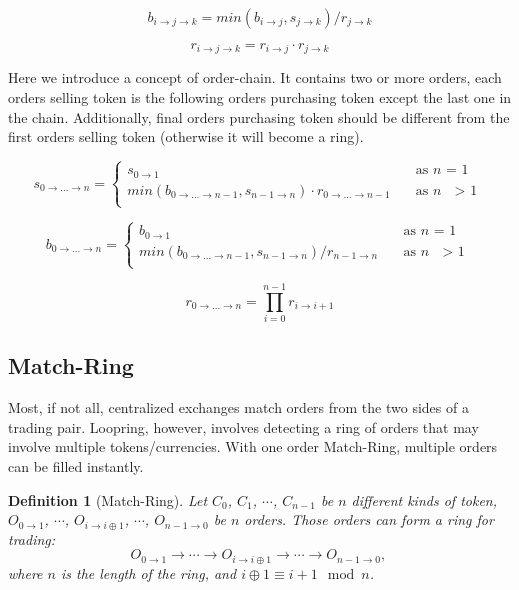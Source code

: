 \documentclass[UTF8,nofonts]{article}
\newtheorem{definition}{Definition}[section]
\begin{document}
\begin{equation}
b_{i\rightarrow j\rightarrow k}=min(b_{i\rightarrow j}, s_{j\rightarrow k}) / r_{j\rightarrow k}
\end{equation}

\begin{equation}
r_{i\rightarrow j\rightarrow k}= r_{i\rightarrow j}\cdot r_{j\rightarrow k}
\end{equation}


Here we introduce a concept of order-chain. It contains two or more orders, each orders selling token is the following orders purchasing token except the last one in the chain. Additionally, final orders purchasing token should be different from the first orders selling token (otherwise it will become a ring).

\[ s_{0\rightarrow ...\rightarrow n} =
 \begin{cases}
  s_{0\rightarrow 1}   & \quad \text{as } n \text{ = 1}\\
  min(b_{0\rightarrow ...\rightarrow n-1}, s_{n-1\rightarrow n}) \cdot r_{0\rightarrow ...\rightarrow n-1} & \quad \text{as\ } n \text{ $>$ 1}\\
 \end{cases}
\]

\[ b_{0\rightarrow ...\rightarrow n} =
 \begin{cases}
  b_{0\rightarrow 1}   & \quad \text{as } n \text{ = 1}\\
  min(b_{0\rightarrow ...\rightarrow n-1}, s_{n-1\rightarrow n}) / r_{n-1\rightarrow n} & \quad \text{as\ } n \text{ $>$ 1}\\
 \end{cases}
\]


\[ r_{0\rightarrow ...\rightarrow n} = \prod_{i=0}^{n-1}{r_{i\rightarrow i+1}}
\]


\subsection{Match-Ring}

Most, if not all, centralized exchanges match orders from the two sides of a trading pair. Loopring, however, involves detecting a ring of orders that may involve multiple tokens/currencies. With one order Match-Ring, multiple orders can be filled instantly.

\begin{definition}[Match-Ring] Let $C_{0}$, $C_{1}$, $\cdots$, $C_{n-1}$ be $n$ different kinds of token, $O_{0\rightarrow 1}$, $\cdots$, $O_{i\rightarrow i\oplus 1}$, $\cdots$, $O_{n-1 \rightarrow 0}$ be $n$ orders. Those orders can form a ring for trading:
$$O_{0\rightarrow 1} \rightarrow \cdots \rightarrow O_{i\rightarrow i\oplus 1} \rightarrow \cdots \rightarrow O_{n-1\rightarrow 0} \text{, }$$
where $n$ is the length of the ring, and $i\oplus 1 \equiv i+1 \mod n$.
\end{definition}
\end{document}
